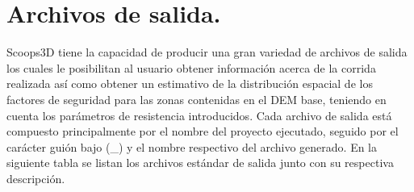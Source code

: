 \section{Archivos de salida.}
\label{chap: archivos de salida}
Scoops3D tiene la capacidad de producir una gran variedad de archivos de salida los
cuales le posibilitan al usuario obtener informaci\'{o}n acerca de la corrida realizada as\'{i} como
obtener un estimativo de la distribuci\'{o}n espacial de los factores de seguridad para las zonas
contenidas en el DEM base, teniendo en cuenta los par\'{a}metros de resistencia introducidos.
Cada archivo de salida est\'{a} compuesto principalmente por el nombre del proyecto ejecutado, seguido por el car\'{a}cter gui\'{o}n bajo (\_) y el nombre respectivo del archivo generado.
En la siguiente tabla se listan los archivos est\'{a}ndar de salida junto con su respectiva descripci\'{o}n.


